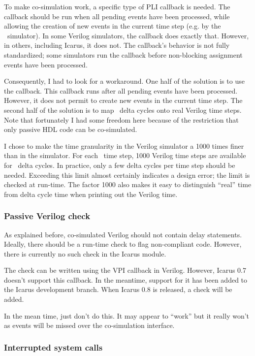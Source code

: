 To make co-simulation work, a specific type of PLI callback is
needed. The callback should be run when all pending events have been
processed, while allowing the creation of new events in the current
time step (e.g. by the \myhdl\ simulator).  In some Verilog
simulators, the  callback does exactly
that. However, in others, including Icarus, it does not. The
callback's behavior is not fully standardized; some simulators run the
callback before non-blocking assignment events have been processed.

Consequently, I had to look for a workaround. One half of the solution
is to use the  callback.  This callback runs
after all pending events have been processed.  However, it does not
permit to create new events in the current time step.  The second half
of the solution is to map \myhdl\ delta cycles onto real Verilog time
steps.  Note that fortunately I had some freedom here because of the
restriction that only passive HDL code can be co-simulated.

I chose to make the time granularity in the Verilog simulator a 1000
times finer than in the \myhdl{} simulator. For each \myhdl\ time
step, 1000 Verilog time steps are available for \myhdl\ delta
cycles. In practice, only a few delta cycles per time step should be
needed. Exceeding this limit almost certainly indicates a design error;
the limit is checked at run-time. The factor 1000 also makes it
easy to distinguish ``real'' time from delta cycle time when printing
out the Verilog time.

\subsubsection{Passive Verilog check}

As explained before, co-simulated Verilog should not contain delay
statements. Ideally, there should be a run-time check to flag
non-compliant code. However, there is currently no such check in the
Icarus module.

The check can be written using the  VPI callback
in Verilog. However, Icarus 0.7 doesn't support this callback. In the
meantime, support for it has been added to the Icarus development
branch.  When Icarus 0.8 is released, a check will be added.

In the mean time, just don't do this. It may appear to ``work'' but it
really won't as events will be missed over the co-simulation
interface.

\subsubsection{Interrupted system calls}

